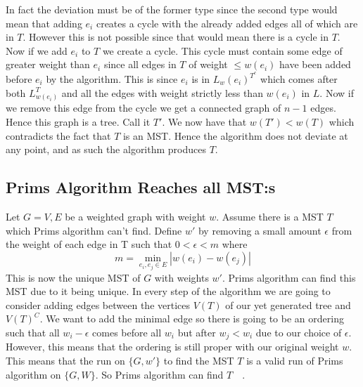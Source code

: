 \documentclass[nobib]{tufte-handout}
\begin{document}
            In fact the deviation must be of the former type since the second type would mean that adding $e_i$ creates a cycle with the already added edges all of which are in $T$. However this is not possible since that would mean there is a cycle in $T$. \\

            Now if we add $e_i$ to $T$ we create a cycle. This cycle must contain some edge of greater weight than $e_i$ since all edges in $T$ of weight $\leq w(e_i)$ have been added before $e_i$ by the algorithm. This is since $e_i$ is in $L_w(e_i)^{T^c}$ which comes after both $L_{w(e_i)}^T$ and all the edges with weight strictly less than $w(e_i)$ in $L$. Now if we remove this edge from the cycle we get a connected graph of $n - 1$ edges. Hence this graph is a tree. Call it $T'$. We now have that $w(T') < w(T)$ which contradicts the fact that $T$ is an MST. Hence the algorithm does not deviate at any point, and as such the algorithm produces $T$.

            
        
\subsection{Prims Algorithm Reaches all MST:s}

Let \(G={V,E} \) be a weighted graph with weight \( w \). Assume there is a MST \( T \) which Prims algorithm can't find. Define \( w' \) by removing a small amount \( \epsilon \) from the weight of each edge in T such that \( 0<\epsilon<m\) where 
\begin{equation*}
 m=\min\limits_{e_i,e_j\in E}|w(e_i)-w(e_j)|
\end{equation*}This is now the unique MST of \(G \) with weights \( w' \). Prims algorithm can find this MST due to it being unique. In every step of the algorithm we are going to consider adding edges between the vertices \( V(T)\) of our yet generated tree and \(V(T)^C\). We want to add the minimal edge so there is going to be an ordering such that all \( w_i-\epsilon \) comes before all \( w_i\) but after \( w_j<w_i \) due to our choice of \( \epsilon \). However, this means that the ordering is still proper with our original weight \( w \). This means that the run on \( \{G,w'\} \) to find the MST \(T\) is a valid run of Prims algorithm on \( \{G,W\}\). So Prims algorithm can find \( T \quad \).
\end{document}
